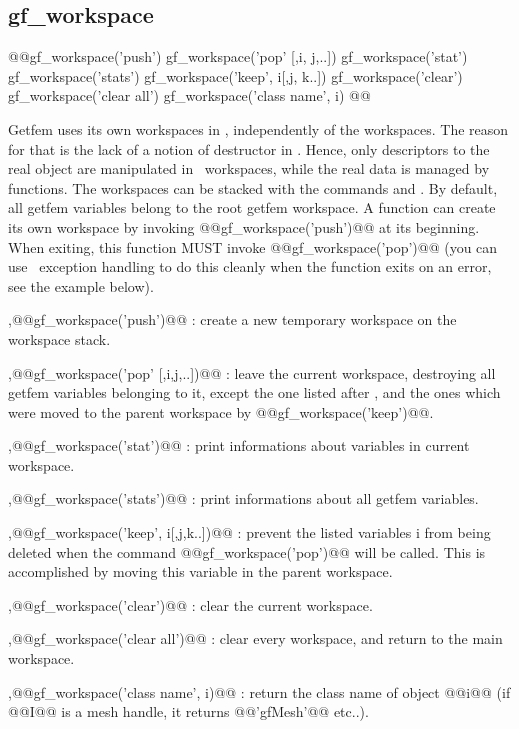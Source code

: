 \newpage
\subsection{gf\_workspace}
\begin{synopsis}
@@gf\_workspace('push') 
gf_workspace('pop' [,\thobj i, \thobj j,..])  
gf_workspace('stat') 
gf_workspace('stats')
gf_workspace('keep', \thobj i[,\thobj j, \thobj k..]) 
gf_workspace('clear')
gf_workspace('clear all')
gf_workspace('class name', \thobj i)
@@\end{synopsis}
\begin{cmddescription}
  Getfem uses its own workspaces in \Mlab, independently of the \mlab
  workspaces. The reason for that is the lack of a notion of destructor in
  \mlab. Hence, only descriptors to the real object are manipulated in \mlab\ workspaces, while the real data is managed by \gf functions. The \gf workspaces can be stacked with the commands 
  and . By default, all getfem variables belong to the root getfem
  workspace. A function can create its own workspace by invoking
  @@gf\_workspace('push')@@ at its beginning. When exiting, this function
  MUST invoke @@gf\_workspace('pop')@@ (you can use \mlab\ exception
  handling to do this cleanly when the function exits on an error, see the
  example below).

  \sep{@@gf\_workspace('push')@@} : create a new temporary workspace on
  the workspace stack.

  
  \sep{@@gf\_workspace('pop' [,i,j,..])@@} : leave the current
  workspace, destroying all getfem variables belonging to it, except
  the one listed after , and the ones which were moved to the
  parent workspace by @@gf\_workspace('keep')@@.

  \sep{@@gf\_workspace('stat')@@} : print informations about variables
  in current workspace.

  \sep{@@gf\_workspace('stats')@@} 
  : print informations about all getfem variables.
  
  \sep{@@gf\_workspace('keep', i[,j,k..])@@}  
  : prevent the listed variables i from being deleted when the command
  @@gf\_workspace('pop')@@ will be called. This is accomplished by
  moving this variable in the parent workspace.

  \sep{@@gf\_workspace('clear')@@}
  : clear the current workspace.

  \sep{@@gf\_workspace('clear all')@@}
  : clear every workspace, and return to the main workspace.

  \sep{@@gf\_workspace('class name', i)@@}
  : return the class name of object @@i@@ (if @@I@@ is a mesh handle, it returns @@'gfMesh'@@ etc..).
\end{cmddescription}

